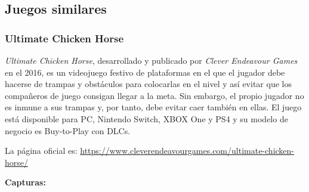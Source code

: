 \subsection{Juegos similares}

\subsubsection{Ultimate Chicken Horse}

\emph{Ultimate Chicken Horse}, desarrollado y publicado por \emph{Clever
Endeavour Games} en el 2016, es un videojuego festivo de plataformas en el que
el jugador debe hacerse de trampas y obstáculos para colocarlas en el nivel y
así evitar que los compañeros de juego consigan llegar a la meta. Sin embargo,
el propio jugador no es inmune a sus trampas y, por tanto, debe evitar caer
también en ellas. El juego está disponible para PC, Nintendo Switch, XBOX One y
PS4 y su modelo de negocio es Buy-to-Play con DLCs.

La página oficial es:
\url{https://www.cleverendeavourgames.com/ultimate-chicken-horse/}

\textbf{Capturas:}

